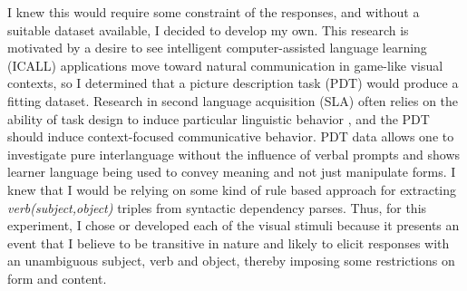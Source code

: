 
%
I knew this would require some constraint of the responses, and without a suitable dataset available, I decided to develop my own. This research is motivated by a desire to see intelligent computer-assisted language learning (ICALL) applications move toward natural communication in game-like visual contexts, so I determined that a picture description task (PDT) would produce a fitting dataset. Research in second language acquisition (SLA) often relies on the
ability of task design to induce particular linguistic behavior
\citep{skehan1998assessing}, and the PDT should induce context-focused
communicative behavior. PDT data allows one to investigate
pure interlanguage without the influence of verbal prompts and shows
learner language being used to convey meaning and not just manipulate forms.
I knew that I would be relying on some kind of rule based approach for extracting \textit{verb(subject,object)} triples from syntactic dependency parses. Thus, for this experiment, I chose or developed each of the visual stimuli because it presents an event that I believe to be transitive in nature and likely to elicit responses with an unambiguous subject, verb and
object, thereby imposing some restrictions on form and content.

